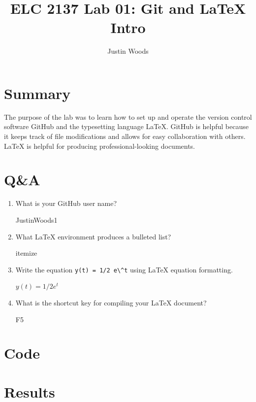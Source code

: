 \documentclass[11pt]{article}
\newcommand{\Verilog}[2][]{%
	
}
\begin{document}
\title {ELC 2137 Lab 01: Git and LaTeX Intro}
\author {Justin Woods}

\maketitle


\section*{Summary}

The purpose of the lab was to learn how to set up and operate the version control software GitHub and the typesetting language LaTeX.
 GitHub is helpful because it keeps track of file modifications and allows for easy collaboration with others.
  LaTeX is helpful for producing professional-looking documents. 


\section*{Q\&A}

\begin{enumerate}
	
	\item What is your GitHub user name?
	
	JustinWoods1
	
	\item What LaTeX environment produces a bulleted list?

	
	 itemize
	 
	\item Write the equation \verb|y(t) = 1/2 e\^t| using LaTeX equation formatting.
	
		 $y(t) = 1/2 e^t$
	 
	\item What is the shortcut key for compiling your LaTeX document?
	
	F5
	
	
\end{enumerate}

\section*{Code}

\Verilog{example_or.sv}

\section*{Results}
\end{document}
